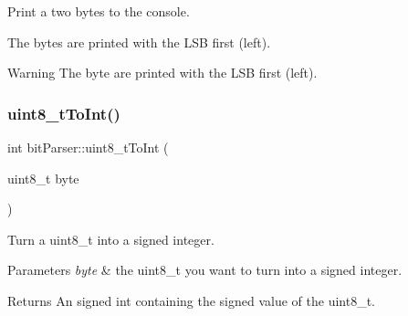 Print a two bytes to the console. 

The bytes are printed with the L\+SB first (left). \begin{DoxyWarning}{Warning}
The byte are printed with the L\+SB first (left). 
\end{DoxyWarning}
\mbox{\label{group__bit_parser_ga2cdf3099581569732367d0fc965e0a7e}} 
\subsubsection{\texorpdfstring{uint8\+\_\+t\+To\+Int()}{uint8\_tToInt()}}
{\footnotesize\ttfamily int bit\+Parser\+::uint8\+\_\+t\+To\+Int (\begin{DoxyParamCaption}\item[{uint8\+\_\+t}]{byte }\end{DoxyParamCaption})}



Turn a uint8\+\_\+t into a signed integer. 


\begin{DoxyParams}{Parameters}
{\em byte} & the uint8\+\_\+t you want to turn into a signed integer. \\
\hline
\end{DoxyParams}
\begin{DoxyReturn}{Returns}
An signed int containing the signed value of the uint8\+\_\+t. 
\end{DoxyReturn}
